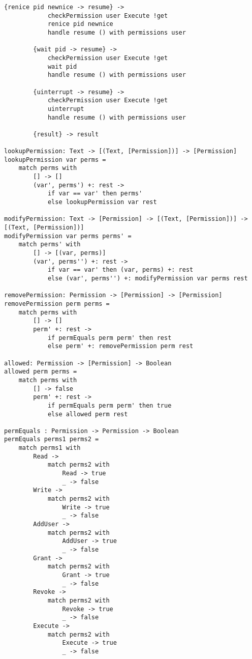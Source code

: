 \documentclass[logo,bsc,singlespacing,parskip]{infthesis}
\begin{document}
\begin{lstlisting}[language=unison]
        {renice pid newnice -> resume} ->
            checkPermission user Execute !get
            renice pid newnice
            handle resume () with permissions user

        {wait pid -> resume} ->
            checkPermission user Execute !get
            wait pid
            handle resume () with permissions user

        {uinterrupt -> resume} ->
            checkPermission user Execute !get
            uinterrupt
            handle resume () with permissions user

        {result} -> result

lookupPermission: Text -> [(Text, [Permission])] -> [Permission]
lookupPermission var perms =
    match perms with
        [] -> []
        (var', perms') +: rest ->
            if var == var' then perms'
            else lookupPermission var rest

modifyPermission: Text -> [Permission] -> [(Text, [Permission])] -> [(Text, [Permission])]
modifyPermission var perms perms' =
    match perms' with
        [] -> [(var, perms)]
        (var', perms'') +: rest ->
            if var == var' then (var, perms) +: rest
            else (var', perms'') +: modifyPermission var perms rest

removePermission: Permission -> [Permission] -> [Permission]
removePermission perm perms =
    match perms with
        [] -> []
        perm' +: rest ->
            if permEquals perm perm' then rest
            else perm' +: removePermission perm rest

allowed: Permission -> [Permission] -> Boolean
allowed perm perms =
    match perms with
        [] -> false
        perm' +: rest ->
            if permEquals perm perm' then true
            else allowed perm rest

permEquals : Permission -> Permission -> Boolean
permEquals perms1 perms2 = 
    match perms1 with 
        Read -> 
            match perms2 with 
                Read -> true
                _ -> false
        Write -> 
            match perms2 with 
                Write -> true
                _ -> false
        AddUser -> 
            match perms2 with 
                AddUser -> true
                _ -> false
        Grant ->
            match perms2 with 
                Grant -> true
                _ -> false
        Revoke ->
            match perms2 with 
                Revoke -> true
                _ -> false
        Execute ->
            match perms2 with 
                Execute -> true
                _ -> false


\end{lstlisting}
\end{document}
